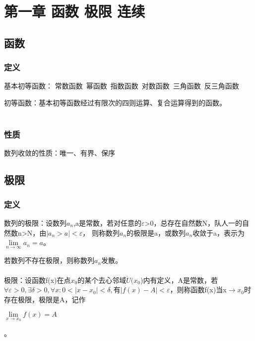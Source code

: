 \documentclass{ctexart}
\begin{document}

\tableofcontents
\newpage


\section{第一章 函数 极限 连续}
\subsection{函数}
\subsubsection{定义}
基本初等函数：
常数函数\ 幂函数\ 指数函数\ 对数函数\ 三角函数\ 反三角函数

初等函数：基本初等函数经过有限次的四则运算、复合运算得到的函数。
\\\\

\subsubsection{性质}

数列收敛的性质：唯一、有界、保序

\subsection{极限}
\subsubsection{定义}
数列的极限：设数列${a_n}$,a是常数，若对任意的$\varepsilon$>0，总存在自然数N，队人一的自然数n>N，由$|a_n>a|<\varepsilon$，
则称数列${a_n}$的极限是a，或数列${a_n}$收敛于a，表示为$\lim\limits_{n \rightarrow \infty}a_n = a$。

若数列不存在极限，则称数列${a_n}$发散。
\\\\

极限：设函数f(x)在点$x_0$的某个去心邻域$\mathring{U}(x_0$)内有定义，A是常数，若$\forall \varepsilon > 0,\exists \delta >0,\forall x: 0<|x-x_0|<\delta,有|f(x)-A|<\varepsilon$，则称函数f(x)当x$\rightarrow x_0$时存在极限，极限是A，记作
\begin{center}
$\lim\limits_{x \rightarrow x_0} f(x)=A$\\
\end{center}。
\\\\
\end{document}
